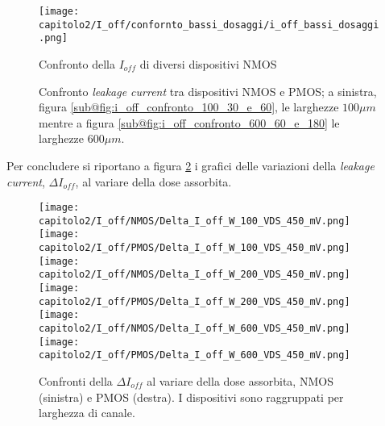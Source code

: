 \begin{figure}[h]

    \centering
    
    \texttt{[image: capitolo2/I\_off/confornto\_bassi\_dosaggi/i\_off\_bassi\_dosaggi.png]}
    \caption[Confronto della $I_{off}$ di diversi dispositivi]{Confronto della $I_{off}$ di diversi dispositivi NMOS}
    \label{fig:i_off_confronto_bassi_dosaggi}
    
    \vspace{1cm}
    
    \centering

    \caption[Confronto \textit{leakage current} tra dispositivi]{Confronto \textit{leakage current} tra dispositivi NMOS e PMOS; a sinistra, figura \ref{sub@fig:i_off_confronto_100_30_e_60}, le larghezze $100\mu m$ mentre a figura \ref{sub@fig:i_off_confronto_600_60_e_180} le larghezze $600\mu m$.}
    \label{fig:i_off_confronto}
    

\end{figure}

\vspace{0.5cm}
Per concludere si riportano a figura \ref{fig:delta_i_off} i grafici delle variazioni della \textit{leakage current}, $\Delta I_{off}$, al variare della dose assorbita.

\clearpage

\begin{figure}[ht]
    
    \texttt{[image: capitolo2/I\_off/NMOS/Delta\_I\_off\_W\_100\_VDS\_450\_mV.png]}
    \texttt{[image: capitolo2/I\_off/PMOS/Delta\_I\_off\_W\_100\_VDS\_450\_mV.png]}\\
    \vspace{0.2cm}
    \texttt{[image: capitolo2/I\_off/NMOS/Delta\_I\_off\_W\_200\_VDS\_450\_mV.png]}
    \texttt{[image: capitolo2/I\_off/PMOS/Delta\_I\_off\_W\_200\_VDS\_450\_mV.png]}\\
    \vspace{0.2cm}
    \texttt{[image: capitolo2/I\_off/NMOS/Delta\_I\_off\_W\_600\_VDS\_450\_mV.png]}
    \texttt{[image: capitolo2/I\_off/PMOS/Delta\_I\_off\_W\_600\_VDS\_450\_mV.png]}
    
    \caption[$\Delta I_{off}$ al variare della dose assorbita]{Confronti della $\Delta I_{off}$ al variare della dose assorbita, NMOS (sinistra) e PMOS (destra). I dispositivi sono raggruppati per larghezza di canale.}
    \label{fig:delta_i_off}
\end{figure}

\FloatBarrier